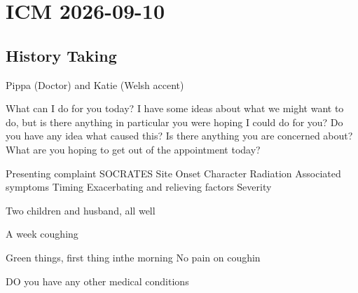 \chapter{ICM 2026-09-10}

\section{History Taking}

Pippa (Doctor) and Katie (Welsh accent)

What can I do for you today?
I have some ideas about what we might want to do, but is there anything in particular you were hoping I could do for you?
Do you have any idea what caused this?
Is there anything you are concerned about?
What are you hoping to get out of the appointment today?


Presenting complaint
SOCRATES
Site
Onset
Character
Radiation
Associated symptoms
Timing
Exacerbating and relieving factors
Severity


Two children and husband, all well

A week coughing

Green things, first thing inthe morning 
No pain on coughin

DO you have any other medical conditions

